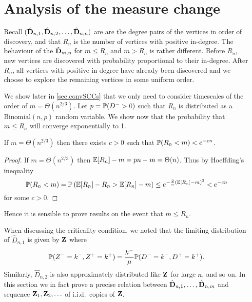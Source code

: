 \section{Analysis of the measure change}
\label{sec:measure-change}

Recall $(\hat{\vD}_{n, 1}, \hat{\vD}_{n, 2}, \ldots, \hat{\vD}_{n, n})$ are are the degree pairs of the vertices in order of discovery, and that $R_n$ is the number of vertices with positive in-degree. The behaviour of the $\hat{\vD}_{m, n}$ for $m \leq R_n$ and $m > R_n$ is rather different. Before $R_n$, new vertices are discovered with probability proportional to their in-degree. After $R_n$, all vertices with positive in-degree have already been discovered and we choose to explore the remaining vertices in some uniform order.

We show later in \cref{sec.convSCCs} that we only need to consider timescales of the order of $m = \Theta(n^{2/3})$. Let $p = \P(D^- > 0)$ such that $R_n$ is distributed as a $\text{Binomial}(n, p)$ random variable. We show now that the probability that $m \leq R_n$ will converge exponentially to 1.
\begin{lemma}
    If $m = \Theta(n^{2/3})$ then there exists $c > 0$ such that $\P(R_n < m) < e^{-c n}$.
\end{lemma}
\begin{proof}
    If $m = \Theta(n^{2/3})$ then $\E[R_n] - m = pn - m = \Theta(n)$. Thus by Hoeffding's inequality
    \begin{equation*}
        \P(R_n < m)
        = \P\left(\E[R_n] - R_n > \E[R_n] - m\right)
        \leq e^{-\frac{2}{n} (\E[R_n] - m)^2} < e^{-cn}
    \end{equation*}
    for some $c > 0$.
\end{proof}
Hence it is sensible to prove results on the event that $m \leq R_n$.

When discussing the criticality condition, we noted that the limiting distribution of $\hat{D}_{n, 1}$ is given by $\vZ$ where
\begin{equation*}
    \P(Z^- = k^-, Z^+ = k^+) = \frac{k^-}{\mu}\P(D^- = k^-, D^+ = k^+).
\end{equation*}
Similarly, $\hat{D}_{n, 2}$ is also approximately distributed like $\vZ$ for large $n$, and so on. In this section we in fact prove a precise relation between $\hat{\vD}_{n, 1}, \ldots, \hat{\vD}_{n, m}$ and sequence $\vZ_1, \vZ_2, \ldots$ of i.i.d.\ copies of $\vZ$.

